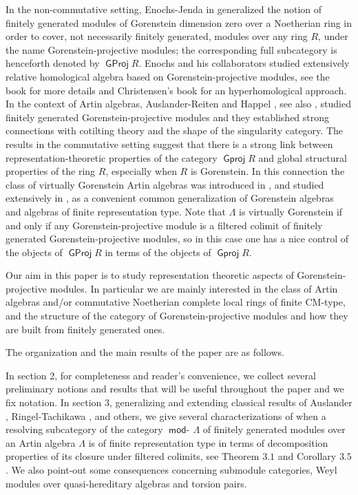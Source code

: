\documentclass[oneside, a4paper,reqno]{amsart}
\numberwithin{equation}{section}
\theoremstyle{definition}
\begin{document}
In the non-commutative setting, Enochs-Jenda in \cite{EJ}
generalized the notion of finitely generated modules of Gorenstein
dimension zero over a Noetherian ring in order to cover, not
necessarily finitely generated, modules over any ring $R$, under the
name Gorenstein-projective modules; the corresponding full
subcategory is henceforth denoted by ${\operatorname{\mathsf{GProj}}\nolimits} R$. Enochs and his
collaborators studied extensively relative homological algebra based
on Gorenstein-projective modules, see the book \cite{EJ:book} for
more details and Christensen's book \cite{Christensen} for an
hyperhomological approach. In the context of Artin algebras,
Auslander-Reiten \cite{AR:applications, AR:cm} and Happel
\cite{Happel}, see also \cite{Buchweitz:tate,BR}, studied finitely
generated Gorenstein-projective modules and they established strong
connections with cotilting theory and the shape of the singularity
category.  The results in the
commutative setting suggest that there is a strong link between
representation-theoretic properties of the category ${\operatorname{\mathsf{Gproj}}\nolimits} R$ and
global structural properties of the ring $R$, especially when $R$ is
Gorenstein. In this connection the class of virtually Gorenstein
Artin algebras was introduced in \cite{BR}, and studied extensively
in \cite{B:cm, BK}, as a convenient common generalization of
Gorenstein  algebras and  algebras of finite representation type.
Note that $\Lambda$ is virtually Gorenstein if and only if any
Gorenstein-projective module is a filtered colimit of finitely
generated Gorenstein-projective modules, so in this case one has a
nice control of the objects of ${\operatorname{\mathsf{GProj}}\nolimits} R$ in terms of the objects of
${\operatorname{\mathsf{Gproj}}\nolimits} R$.

Our aim in this paper is to study representation theoretic aspects
of Gorenstein-projective modules.  In particular we are mainly
interested in the class of Artin algebras and/or commutative
Noetherian complete local rings of finite CM-type, and the structure
of the category of Gorenstein-projective modules and how they are
built from finitely generated ones.

The organization and the main results of the paper are as follows.

In section 2, for completeness and reader's convenience, we collect
several preliminary notions and results that will be useful
throughout the paper and we fix notation. In section 3, generalizing
and extending  classical results of Auslander
\cite{Auslander:large}, Ringel-Tachikawa \cite{RT}, and others, we
give several characterizations of when a resolving subcategory of
the category $\operatorname*{\mathsf{mod}-\!}\Lambda$ of finitely generated modules over an
Artin algebra $\Lambda$ is of finite representation type in terms of
decomposition properties of its closure under filtered colimits, see
Theorem $3.1$ and Corollary $3.5$. We also point-out some
consequences concerning submodule categories, Weyl modules over
quasi-hereditary algebras and torsion pairs.
\end{document}
